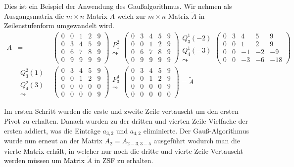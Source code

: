 Dies ist ein Beispiel der Anwendung des Gaußalgorithmus.
Wir nehmen als  Ausgangsmatrix die $m\times n$-Matrix $A$ welch zur $m \times n$-Matrix $\tilde{A}$ in Zeilenstufenform umgewandelt wird.  
\begin{eqnarray*}
A&=&\begin{pmatrix}
0 & 0 & 1 & 2 & 9 \\ 
0 & 3 & 4 & 5 & 9 \\ 
0 & 6 & 7 & 8 & 9 \\ 
0 & 9 & 9 & 9 & 9
\end{pmatrix}
\substack{P_1^2\\\leadsto}
\begin{pmatrix}
0 & 3 & 4 & 5 & 9 \\ 
0 & 0 & 1 & 2 & 9 \\ 
0 & 6 & 7 & 8 & 9 \\ 
0 & 9 & 9 & 9 & 9
\end{pmatrix}
\substack{Q_3^1(-2)\\Q_4^1(-3)\\\leadsto} 
\begin{pmatrix}
 0 & 3 & 4 & 5 & 9 \\ 
 0 & 0 & 1 & 2 & 9 \\ 
 0 & 0 & -1 & -2 & -9 \\ 
 0 & 0 & -3 & -6 & -18
\end{pmatrix}\\
&\substack{Q_3^2(1)\\Q_4^2(3)\\\leadsto} &
\begin{pmatrix}
  0 & 3 & 4 & 5 & 9 \\ 
  0 & 0 & 1 & 2 & 9 \\ 
  0 & 0 & 0 & 0 & 0 \\ 
  0 & 0 & 0 & 0 & 9
  \end{pmatrix}
\substack{P_3^4\\\leadsto}
\begin{pmatrix}
  0 & 3 & 4 & 5 & 9 \\ 
  0 & 0 & 1 & 2 & 9 \\ 
  0 & 0 & 0 & 0 & 9 \\ 
  0 & 0 & 0 & 0 & 0
 \end{pmatrix}=\tilde{A}  
 \end{eqnarray*}
 
 Im ersten Schritt wurden die erste und zweite Zeile vertauscht um den ersten Pivot zu erhalten. Danach wurden zu der dritten und vierten Zeile Vielfache der ersten addiert, was die Einträge $a_{3,2}$ und $a_{4,2}$ eliminierte. Der Gauß-Algorithmus wurde nun erneut an der Matrix $A_2=A_{2-3,3-5}$ ausgeführt wodurch man die vierte Matrix erhält, in welcher nur noch die dritte und vierte Zeile Vertauscht werden müssen um Matrix $\tilde{A}$ in ZSF zu erhalten.
